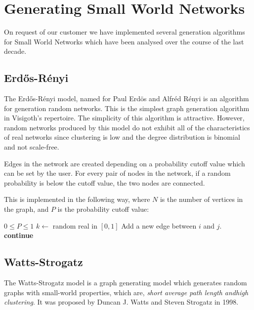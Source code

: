 \documentclass[a4paper,11pt,titlepage]{article}
\let\stdsection\section         %
\renewcommand{\section}{\newpage\stdsection}
\begin{document}
\section{Generating Small World Networks}
\label{smallworldnetworks}

On request of our customer we have implemented several generation
algorithms for Small World Networks which have been analysed over
the course of the last decade.

\subsection{Erd\H{o}s-R\'{e}nyi}
The Erd\H{o}s-R\'{e}nyi model, named for Paul Erd\"{o}s and Alfr\'{e}d R\'{e}nyi
is an algorithm for generation random networks. This is the simplest graph
generation algorithm in Visigoth's repertoire. The simplicity of this algorithm
is attractive. However, random networks produced by this model do not exhibit
all of the characteristics of real networks since clustering is low and the
degree distribution is binomial and not scale-free.

Edges in the network are created depending on a probability cutoff value which
can be set by the user. For every pair of nodes in the network, if a random
probability is below the cutoff value, the two nodes are connected.

This is implemented in the following way, where $N$ is the number of vertices
in the graph, and $P$ is the probability cutoff value:
\begin{algorithmic}
  \REQUIRE $0 \leq P \leq 1$
      \STATE $k \gets $ random real in $[0, 1]$
        \STATE Add a new edge between $i$ and $j$.
      \ELSE
        \STATE \textbf{continue}
      \ENDIF
    \ENDFOR
  \ENDFOR
\end{algorithmic}

\subsection{Watts-Strogatz}
The Watts-Strogatz model is a graph generating model which generates random
graphs with small-world properties, which are, \emph{short average path length
andhigh clustering}. It was proposed by Duncan J. Watts and Steven Strogatz in
1998.
\end{document}
